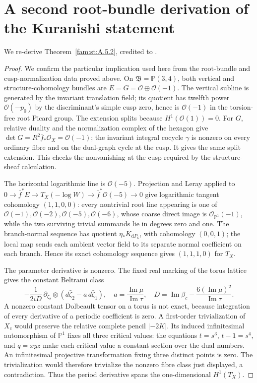 \section{A second root-bundle derivation of the Kuranishi statement}\label{app:cdp-kuranishi}
We re-derive Theorem~\ref{fam:st:A.5.2}, credited to \citet[Theorem~6.12 and Proposition~6.16]{DuEtAl2026v1}.
\begin{proof}
We confirm the particular implication used here from the root-bundle and cusp-normalization data proved above. On $\mathfrak B=\mathbb P(3,4)$, both vertical and
structure-cohomology bundles are $E=G=\mathcal O\oplus\mathcal O(-1)$.
The vertical subline is generated by the invariant translation
field; its quotient has twelfth power $\mathcal O(-p_0)$ by the
discriminant's simple cusp zero, hence is $\mathcal O(-1)$ in the
torsion-free root Picard group. The extension splits because
$H^1(\mathcal O(1))=0$. For $G$, relative duality and the
normalization complex of the hexagon give
$\det G=R^2\bar f_*\mathcal O_X=\mathcal O(-1)$; the invariant
integral cocycle $\gamma$ is nonzero on every ordinary fibre and
on the dual-graph cycle at the cusp. It gives the same split
extension. This checks the nonvanishing at the cusp required by the structure-sheaf calculation.

The horizontal logarithmic line is $\mathcal O(-5)$. Projection
and Leray applied to
$0\to\bar f^*E\to T_X(-\log W)\to\bar f^*\mathcal O(-5)\to0$
give logarithmic tangent cohomology $(1,1,0,0)$: every nontrivial
root line appearing is one of
$\mathcal O(-1),\mathcal O(-2),\mathcal O(-5),\mathcal O(-6)$,
whose coarse direct image is $\mathcal O_{\mathbb P^1}(-1)$,
while the two surviving trivial summands lie in degrees zero
and one. The branch-normal sequence has quotient
$\eta_*K_{\mathrm dP_6}$, with cohomology $(0,0,1)$; the local
map sends each ambient vector field to its separate normal
coefficient on each branch. Hence its exact cohomology sequence
gives $(1,1,1,0)$ for $T_X$.

The parameter derivative is nonzero. The fixed real marking of
the torus lattice gives the constant Beltrami class
\[
 -\frac{1}{2iD}\,\partial_{\zeta_2}\otimes
 (d\bar\zeta_2-a\,d\bar\zeta_1),
 \quad a=\frac{\operatorname{Im}\mu}{\operatorname{Im}\tau},
 \quad D=\operatorname{Im}\beta_c
       -\frac{6(\operatorname{Im}\mu)^2}{\operatorname{Im}\tau}.
\]
A nonzero constant Dolbeault tensor on a torus is not exact,
because integration of every derivative of a periodic coefficient
is zero. A first-order trivialization of $X_c$ would preserve
the relative complete pencil $|-2K|$. Its induced infinitesimal
automorphism of $\mathbb P^1$ fixes all three critical values:
the equations $t=s^3$, $t-1=s^4$, and $q=xyz$ make each critical
value a constant section over the dual numbers. An infinitesimal
projective transformation fixing three distinct points is zero.
The trivialization would therefore trivialize the nonzero fibre
class just displayed, a contradiction. Thus the period derivative
spans the one-dimensional $H^1(T_X)$.


\end{proof}
